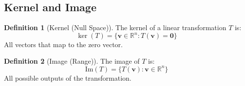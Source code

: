 \documentclass[12pt,a4paper]{article}
\theoremstyle{definition}
\newtheorem{definition}{Definition}[section]
\begin{document}
\subsection{Kernel and Image}

\begin{definition}[Kernel (Null Space)]
The kernel of a linear transformation $T$ is:
\[
\ker(T) = \{\mathbf{v} \in \mathbb{R}^n : T(\mathbf{v}) = \mathbf{0}\}
\]
All vectors that map to the zero vector.
\end{definition}

\begin{definition}[Image (Range)]
The image of $T$ is:
\[
\text{Im}(T) = \{T(\mathbf{v}) : \mathbf{v} \in \mathbb{R}^n\}
\]
All possible outputs of the transformation.
\end{definition}
\end{document}
